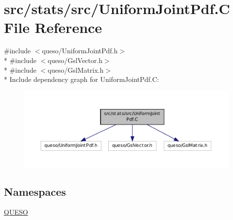 \hypertarget{_uniform_joint_pdf_8_c}{\section{src/stats/src/\-Uniform\-Joint\-Pdf.C File Reference}
\label{_uniform_joint_pdf_8_c}
}
{\ttfamily \#include $<$queso/\-Uniform\-Joint\-Pdf.\-h$>$}\\*
{\ttfamily \#include $<$queso/\-Gsl\-Vector.\-h$>$}\\*
{\ttfamily \#include $<$queso/\-Gsl\-Matrix.\-h$>$}\\*
Include dependency graph for Uniform\-Joint\-Pdf.\-C\-:
\nopagebreak
\begin{figure}[H]
\begin{center}
\leavevmode
\includegraphics[width=350pt]{_uniform_joint_pdf_8_c__incl}
\end{center}
\end{figure}
\subsection*{Namespaces}
\begin{DoxyCompactItemize}
\item 
\hyperlink{namespace_q_u_e_s_o}{Q\-U\-E\-S\-O}
\end{DoxyCompactItemize}
